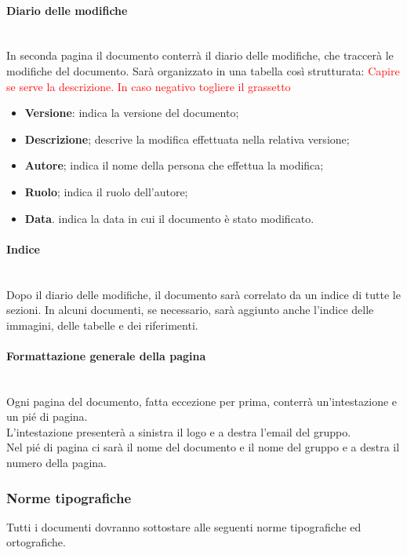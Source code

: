 \paragraph{Diario delle modifiche}
~\\In seconda pagina il documento conterrà il diario delle modifiche, che traccerà le modifiche del documento. Sarà organizzato in una tabella così strutturata:
\textcolor{red}{Capire se serve la descrizione. In caso negativo togliere il grassetto}
\begin{itemize}
	\item \textbf{Versione}:
	indica la versione del documento;
	\item \textbf{Descrizione};
	descrive la modifica effettuata nella relativa versione;
	\item \textbf{Autore};
	indica il nome della persona che effettua la modifica;
	\item \textbf{Ruolo};
	indica il ruolo dell'autore;
	\item \textbf{Data}.
	indica la data in cui il documento è stato modificato.
\end{itemize}
\paragraph{Indice}
~\\Dopo il diario delle modifiche, il documento sarà correlato da un indice di tutte le sezioni. In alcuni documenti, se necessario, sarà aggiunto anche l'indice delle immagini, delle tabelle e dei riferimenti.
\paragraph{Formattazione generale della pagina}
~\\Ogni pagina del documento, fatta eccezione per prima, conterrà un'intestazione e un pié di pagina.
\\L'intestazione presenterà a sinistra il logo e a destra l'email del gruppo.
\\Nel pié di pagina ci sarà il nome del documento e il nome del gruppo e a destra il numero della pagina.
\subsubsection{Norme tipografiche}
Tutti i documenti dovranno sottostare alle seguenti norme tipografiche ed ortografiche.
